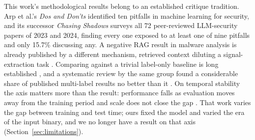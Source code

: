 This work's methodological results belong to an established critique tradition. Arp et al.'s
\emph{Dos and Don'ts} identified ten pitfalls in machine learning for security, and its successor
\emph{Chasing Shadows} \citep{evertz2026chasing} surveys all 72 peer-reviewed LLM-security papers of
2023 and 2024, finding every one exposed to at least one of nine pitfalls and only 15.7\%
discussing any. A negative RAG result in malware analysis is already published by a different
mechanism, retrieved context diluting a signal-extraction task \citep{ng2026evaluating}. Comparing
against a trivial label-only baseline is long established \citep{metz2012baselines}, and a
systematic review by the same group found a considerable share of published multi-label results no
better than it . On temporal stability the axis matters more than
the result: performance falls as evaluation moves away from the training period and scale does not
close the gap \citep{lazaridou2021mind}. That work varies the gap between training and test time;
ours fixed the model and varied the era of the input binary, and we no longer have a result on that
axis (Section~\ref{sec:limitations}).

